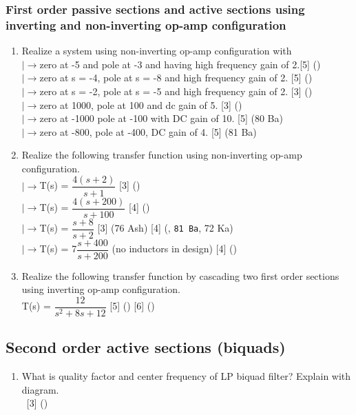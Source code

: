 \documentclass[12pt]{article}
\newcommand{\lb}{\\$\left|\rightarrow\right.$}
\newcommand{\enter}{\\\textcolor{white}{1}}
\begin{document}
		\subsubsection{First order passive sections and active sections using inverting and non-inverting op-amp configuration}
			\begin{enumerate}
				\item Realize a system using non-inverting op-amp configuration with
				\lb zero at -5 and pole at -3 and having high frequency gain of 2.\hfill[5] ()
				\lb zero at s = -4, pole at s = -8 and high frequency gain of 2. \hfill [5] ()
				\lb zero at s = -2, pole at s = -5 and high frequency gain of 2. \hfill [3] ()
				\lb zero at 1000, pole at 100 and dc gain of 5. \hfill [3] ()
				\lb zero at -1000 pole at -100 with DC gain of 10. \hfill [5] (80 Ba)
				\lb zero at -800, pole at -400, DC gain of 4. \hfill [5] (81 Ba)

				\item Realize the following transfer function using non-inverting op-amp configuration.
				\lb T(s) = $\dfrac{4(s+2)}{s+1}$ \hfill [3] ()
				\lb T(s) = $\dfrac{4(s+200)}{s+100}$ \hfill [4] ()
				\lb T(s) = $\dfrac{s+8}{s+2}$ \hfill [3] (76 Ash) [4] (, \texttt{81 Ba}, 72 Ka)
				\lb T(s) = 7$\dfrac{s+400}{s+200}$ (no inductors in design) \hfill [4] ()

				\item Realize the following transfer function by cascading two first order sections using inverting op-amp configuration.\\
				T(s) = $\dfrac{12}{s^2+8s+12}$ \hfill [5] () [6] ()
			\end{enumerate}

	\subsection{Second order active sections (biquads)}
		\begin{enumerate}[noitemsep, topsep=0pt]
			\item What is quality factor and center frequency of LP biquad filter? Explain with diagram.
			\enter\hfill [3] ()
		\end{enumerate}
\end{document}
